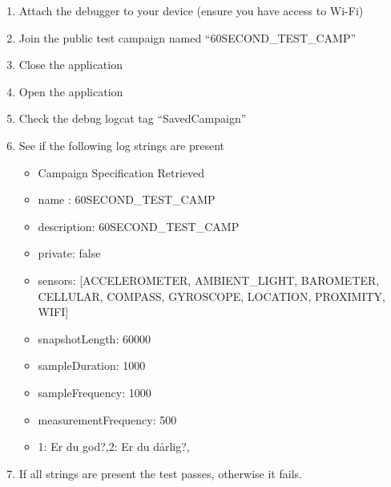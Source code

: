 \begin{enumerate}
    \item Attach the debugger to your device (ensure you have access to Wi-Fi)
    \item Join the public test campaign named ``60SECOND\_TEST\_CAMP''
    \item Close the application
    \item Open the application
    \item Check the debug logcat tag ``SavedCampaign''
    \item See if the following log strings are present
        \begin{itemize}
            \item Campaign Specification Retrieved
            \item name : 60SECOND\_TEST\_CAMP
            \item description: 60SECOND\_TEST\_CAMP
            \item private: false
            \item sensors: [ACCELEROMETER, AMBIENT\_LIGHT, BAROMETER, CELLULAR, COMPASS, GYROSCOPE, LOCATION, PROXIMITY, WIFI]
            \item snapshotLength: 60000
            \item sampleDuration: 1000
            \item sampleFrequency: 1000
            \item measurementFrequency: 500
            \item 1: Er du god?,2: Er du dårlig?,
        \end{itemize}
    \item If all strings are present the test passes, otherwise it fails.
\end{enumerate}